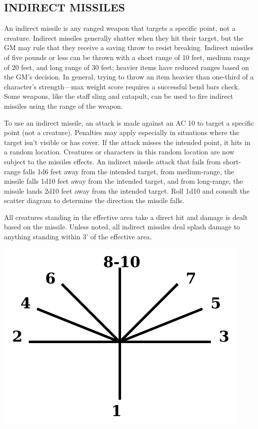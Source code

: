 \begin{multicols}{2}
\subsection{INDIRECT MISSILES}

An indirect missile is any ranged weapon that targets a specific point, not a creature.  Indirect missiles generally shatter when they hit their target, but the GM may rule that they receive a saving throw to resist breaking.  Indirect missiles of five pounds or less can be thrown with a short range of 10 feet, medium range of 20 feet, and long range of 30 feet; heavier items have reduced ranges based on the GM's decision.  In general, trying to throw an item heavier than one-third of a character's strength---max weight score requires a successful bend bars check.  Some weapons, like the staff sling and catapult, can be used to fire indirect missiles using the range of the weapon. 

To use an indirect missile, an attack is made against an AC 10 to target a specific point (not a creature).  Penalties may apply especially in situations where the target isn't visible or has cover.  If the attack misses the intended point, it hits in a random location.   Creatures or characters in this random location are now subject to the missiles effects.  An indirect missile attack that fails from short-range falls 1d6 feet away from the intended target, from medium-range, the missile falls 1d10 feet away from the intended target, and from long-range, the missile lands 2d10 feet away from the intended target.  Roll 1d10 and consult the scatter diagram to determine the direction the missile falls.

All creatures standing in the effective area take a direct hit and damage is dealt based on the missile.  Unless noted, all indirect missiles deal splash damage to anything standing within 3' of the effective area.

\noindent
\begin{minipage}{\columnwidth}

\noindent\includegraphics[width=\columnwidth]{scatter.pdf}


\end{minipage}
\end{multicols}
